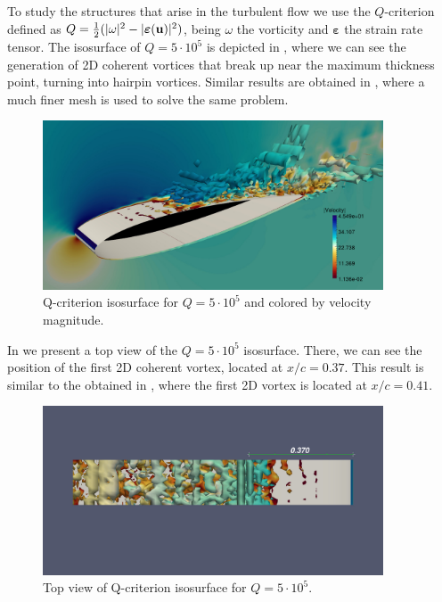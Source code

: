 To study the structures that arise in the turbulent flow we use the $Q$-criterion defined as $ Q=\frac{1}{2}(|\omega|^2-|\boldsymbol{\varepsilon}({\bf u})|^2) $, being $ \omega $ the vorticity and $ \boldsymbol{\varepsilon} $ the strain rate tensor. The isosurface of $ Q=5\cdot 10^5$ is depicted in , where we can see the generation of 2D coherent vortices that break up near the maximum thickness point, turning into hairpin vortices. Similar results are obtained in \cite{kojima_large-eddy_2013}, where a much finer mesh is used to solve the same problem.
\begin{figure}[h!]
  \centering
  \includegraphics[width=0.9\textwidth]{Figures/Chapter8/weak/Q_criterion_3d}
  \caption{Q-criterion isosurface for $ Q=5\cdot10^5 $ and colored by velocity magnitude.}
  \label{fig-NACA_3D_Q}
\end{figure}
In  we present a top view of the $ Q=5\cdot 10^5 $ isosurface. There, we can see the position of the first 2D coherent vortex, located at $ x/c=0.37 $. This result is similar to the obtained in \cite{kojima_large-eddy_2013}, where the first 2D vortex is located at $ x/c=0.41 $.
\begin{figure}[h!]
  \centering
  \includegraphics[width=0.9\textwidth,clip=true,trim=2cm 9cm 2cm 6cm]{Figures/Chapter8/weak/Q_criterion_rule}
  \caption{Top view of Q-criterion isosurface for $ Q=5\cdot10^5 $.}
  \label{fig-NACA_3D_Q_top}
\end{figure}

